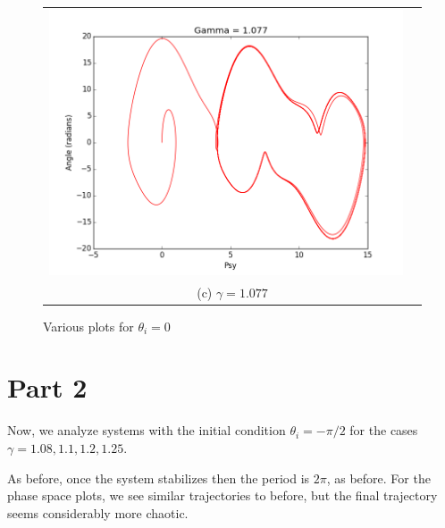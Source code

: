 \documentclass[11pt]{article}
\begin{document}
\begin{figure}[ht]
\begin{tabular}{cc}
\includegraphics[scale=.4]{g077psy.png}\\
\multicolumn{2}{c}{(c) $\gamma = 1.077 $} \\[6pt]
\end{tabular}
\caption{Various plots for $\theta_i = 0 $}

\end{figure}

\section{Part 2}

Now, we analyze systems with the initial condition $\theta_i = - \pi /2 $ for the cases $\gamma = 1.08, 1.1, 1.2, 1.25 $. 

As before, once the system stabilizes then the period is $2 \pi$, as before. For the phase space plots, we see similar trajectories to before, but the final trajectory seems considerably more chaotic. 
\end{document}
